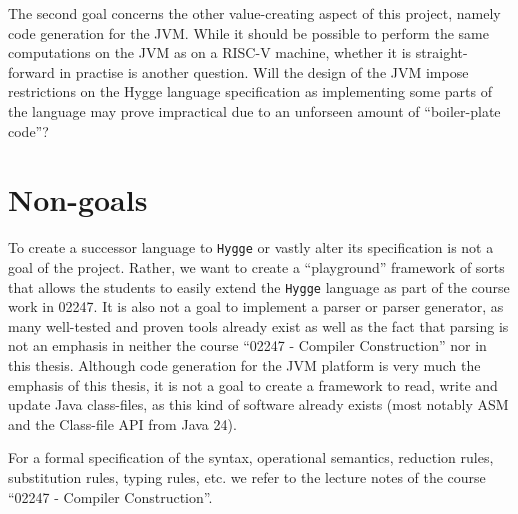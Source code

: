 The second goal concerns the other value-creating aspect of this project, namely code generation for the JVM. While it should be possible to perform the same computations on the JVM
as on a RISC-V machine, whether it is straight-forward in practise is another question. Will the design of the JVM impose restrictions on the Hygge language specification as
implementing some parts of the language may prove impractical due to an unforseen amount of ``boiler-plate code''?

\section{Non-goals}

To create a successor language to \texttt{Hygge} or vastly alter its specification is not a goal of the project. Rather, we want to create a
``playground'' framework of sorts that allows the students to easily extend the \texttt{Hygge} language as part of the course work in 02247. 
It is also not a goal to implement a parser or parser generator, as many well-tested and proven tools already exist as well as the fact that
parsing is not an emphasis in neither the course ``02247 - Compiler Construction'' nor in this thesis. Although code generation for the JVM platform
is very much the emphasis of this thesis, it is not a goal to create a framework to read, write and update Java class-files, as this kind of
software already exists (most notably ASM and the Class-file API from Java 24).

For a formal specification of the syntax, operational semantics, reduction rules, substitution rules, typing rules, etc. we refer to the lecture
notes of the course ``02247 - Compiler Construction''.
